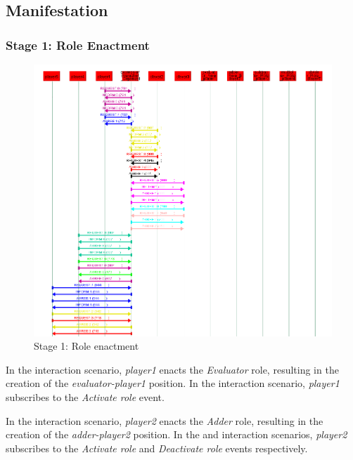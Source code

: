 \subsection*{Manifestation}

\subsubsection*{Stage 1: Role Enactment}

\begin{figure}[H]
	\centering
	\includegraphics[width=\textwidth]{images/examples/example2-stage1}
	\caption{Stage 1: Role enactment}
	\label{figure:example2-stage1}
\end{figure}

In the {} interaction scenario, \textit{player1} enacts the \textit{Evaluator} role, resulting in the creation of the \textit{evaluator-player1} position.
In the {} interaction scenario, \textit{player1} subscribes to the \textit{Activate role} event.

In the {} interaction scenario, \textit{player2} enacts the \textit{Adder} role, resulting in the creation of the \textit{adder-player2} position.
In the {} and {} interaction scenarios, \textit{player2} subscribes to the \textit{Activate role} and \textit{Deactivate role} events respectively.

